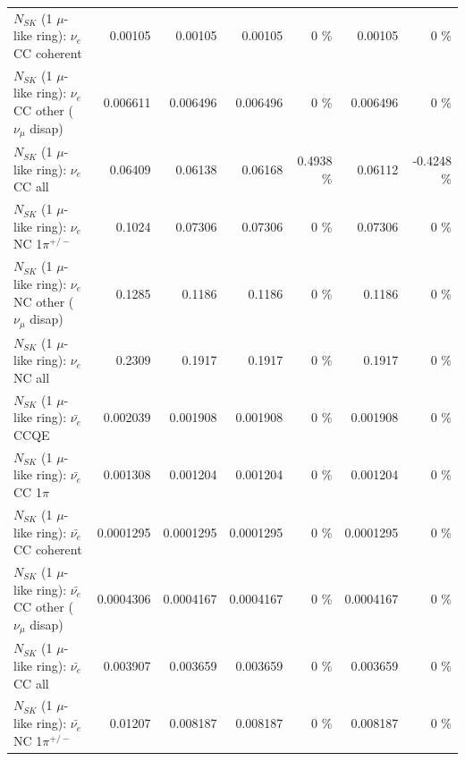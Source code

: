 \begin{table}
\begin{tabular}{| l | r | r | r  r | r  r |}
                               $N_{SK}$ (1 $\mu$-like ring): $\nu_e$ CC coherent &         0.00105 &         0.00105 &         0.00105 &        0 \%  &         0.00105 &        0 \%  \\ 
                $N_{SK}$ (1 $\mu$-like ring): $\nu_e$ CC other ($\nu_\mu$ disap) &        0.006611 &        0.006496 &        0.006496 &        0 \%  &        0.006496 &        0 \%  \\ 
                                  $N_{SK}$ (1 $\mu$-like ring): $\nu_{e}$ CC all &         0.06409 &         0.06138 &         0.06168 &   0.4938 \%  &         0.06112 &  -0.4248 \%  \\ 
\hline
                           $N_{SK}$ (1 $\mu$-like ring): $\nu_e$ NC 1$\pi^{+/-}$ &          0.1024 &         0.07306 &         0.07306 &        0 \%  &         0.07306 &        0 \%  \\ 
                $N_{SK}$ (1 $\mu$-like ring): $\nu_e$ NC other ($\nu_\mu$ disap) &          0.1285 &          0.1186 &          0.1186 &        0 \%  &          0.1186 &        0 \%  \\ 
                                  $N_{SK}$ (1 $\mu$-like ring): $\nu_{e}$ NC all &          0.2309 &          0.1917 &          0.1917 &        0 \%  &          0.1917 &        0 \%  \\ 
\hline
\hline
\hline
                                $N_{SK}$ (1 $\mu$-like ring): $\bar{\nu_e}$ CCQE &        0.002039 &        0.001908 &        0.001908 &        0 \%  &        0.001908 &        0 \%  \\ 
                           $N_{SK}$ (1 $\mu$-like ring): $\bar{\nu_e}$ CC 1$\pi$ &        0.001308 &        0.001204 &        0.001204 &        0 \%  &        0.001204 &        0 \%  \\ 
                         $N_{SK}$ (1 $\mu$-like ring): $\bar{\nu_e}$ CC coherent &       0.0001295 &       0.0001295 &       0.0001295 &        0 \%  &       0.0001295 &        0 \%  \\ 
          $N_{SK}$ (1 $\mu$-like ring): $\bar{\nu_e}$ CC other ($\nu_\mu$ disap) &       0.0004306 &       0.0004167 &       0.0004167 &        0 \%  &       0.0004167 &        0 \%  \\ 
                            $N_{SK}$ (1 $\mu$-like ring): $\bar{\nu_{e}}$ CC all &        0.003907 &        0.003659 &        0.003659 &        0 \%  &        0.003659 &        0 \%  \\ 
\hline
                     $N_{SK}$ (1 $\mu$-like ring): $\bar{\nu_e}$ NC 1$\pi^{+/-}$ &         0.01207 &        0.008187 &        0.008187 &        0 \%  &        0.008187 &        0 \%  \\ 

\end{tabular}
\end{table}
